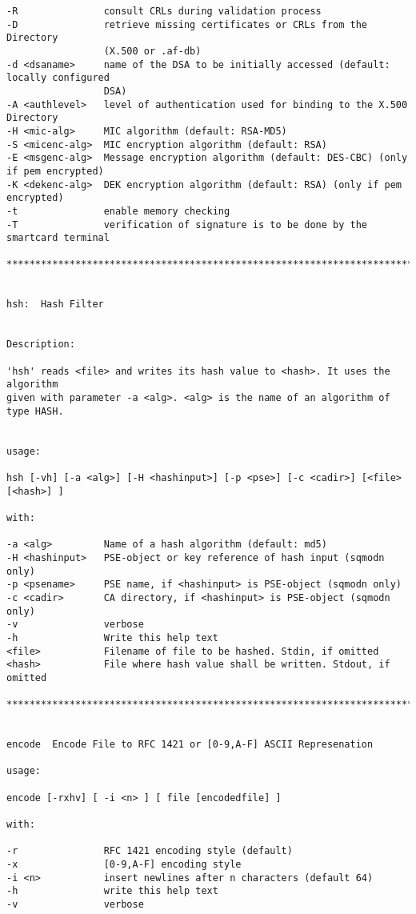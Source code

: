{\begin{verbatim}
-R               consult CRLs during validation process
-D               retrieve missing certificates or CRLs from the Directory 
                 (X.500 or .af-db)
-d <dsaname>     name of the DSA to be initially accessed (default: locally configured 
                 DSA)
-A <authlevel>   level of authentication used for binding to the X.500 Directory
-H <mic-alg>     MIC algorithm (default: RSA-MD5)
-S <micenc-alg>  MIC encryption algorithm (default: RSA)
-E <msgenc-alg>  Message encryption algorithm (default: DES-CBC) (only if pem encrypted)
-K <dekenc-alg>  DEK encryption algorithm (default: RSA) (only if pem encrypted)
-t               enable memory checking
-T               verification of signature is to be done by the smartcard terminal

****************************************************************************************


hsh:  Hash Filter


Description:

'hsh' reads <file> and writes its hash value to <hash>. It uses the algorithm
given with parameter -a <alg>. <alg> is the name of an algorithm of type HASH.


usage:

hsh [-vh] [-a <alg>] [-H <hashinput>] [-p <pse>] [-c <cadir>] [<file> [<hash>] ]

with:

-a <alg>         Name of a hash algorithm (default: md5)
-H <hashinput>   PSE-object or key reference of hash input (sqmodn only)
-p <psename>     PSE name, if <hashinput> is PSE-object (sqmodn only)
-c <cadir>       CA directory, if <hashinput> is PSE-object (sqmodn only)
-v               verbose
-h               Write this help text
<file>           Filename of file to be hashed. Stdin, if omitted
<hash>           File where hash value shall be written. Stdout, if omitted

****************************************************************************************


encode  Encode File to RFC 1421 or [0-9,A-F] ASCII Represenation

usage:

encode [-rxhv] [ -i <n> ] [ file [encodedfile] ]

with:

-r               RFC 1421 encoding style (default)
-x               [0-9,A-F] encoding style
-i <n>           insert newlines after n characters (default 64)
-h               write this help text
-v               verbose


\end{verbatim}}

